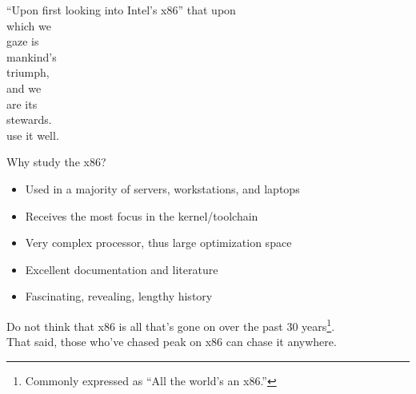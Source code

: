 \documentclass[mathserif,xcolor={dvipsnames,table}]{beamer}
\begin{document}
{
\begin{frame}{``Upon first looking into Intel's x86''}
\hfill that upon\\
\hfill which we \\
\hfill gaze is\\
\hfill mankind's\\
\hfill triumph,\\
\vspace{.8in}
\hfill and we\\
\hfill are its\\
\hfill stewards.\\
\vspace{.5in}
\hfill use it well.\\
\end{frame}
}

\begin{frame}{Why study the x86?}
\begin{itemize}
\item Used in a majority of servers, workstations, and laptops
\item Receives the most focus in the kernel/toolchain
\item Very complex processor, thus large optimization space
\item Excellent documentation and literature
\item Fascinating, revealing, lengthy history
\end{itemize}
\vfill
\vspace{.35in}
Do not think that x86 is all that's gone on over the past
30 years\footnote{Commonly expressed as ``All the world's an x86.''}.\\
\vspace{.35in}
That said, those who've chased peak on x86 can chase it anywhere.
\end{frame}
\end{document}
